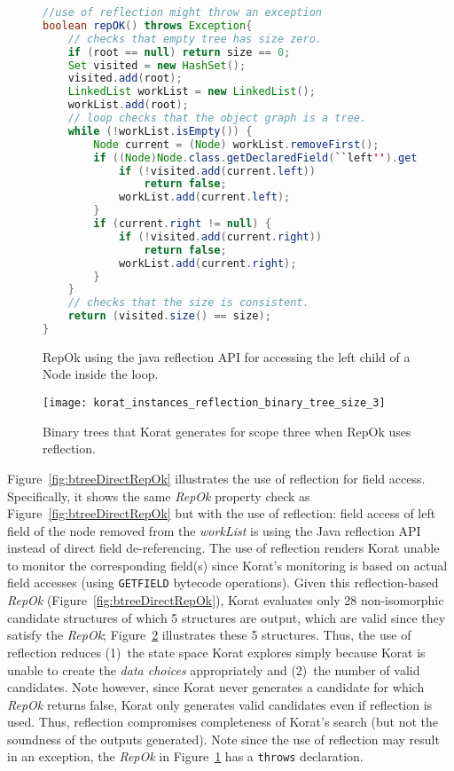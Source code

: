 \begin{figure}
\centering
\begin{lstlisting}[language=Java]
//use of reflection might throw an exception
boolean repOK() throws Exception{
    // checks that empty tree has size zero.
    if (root == null) return size == 0;
    Set visited = new HashSet();
    visited.add(root);
    LinkedList workList = new LinkedList();
    workList.add(root);
    // loop checks that the object graph is a tree.
    while (!workList.isEmpty()) {
        Node current = (Node) workList.removeFirst();
        if ((Node)Node.class.getDeclaredField(``left'').get(current) != null) {
            if (!visited.add(current.left)) 
                return false;
            workList.add(current.left);
        }
        if (current.right != null) {
            if (!visited.add(current.right))
                return false;
            workList.add(current.right);
        }
    }
    // checks that the size is consistent.
    return (visited.size() == size);
}
\end{lstlisting}
\caption{RepOk using the java reflection API for accessing the left child of a Node inside the loop.}
\label{fig:btTreeReflectionRepOK}
\end{figure}


\begin{figure}
\centering
\texttt{[image: korat\_instances\_reflection\_binary\_tree\_size\_3]}
\caption{ Binary trees that Korat generates for scope three when RepOk uses reflection.}
\label{fig:btreeReflectKoratGenScopeThree}
\end{figure}

Figure~\ref{fig:btreeDirectRepOk} illustrates the use of reflection
for field access.  Specifically, it shows the same \emph{RepOk} property
check as Figure~\ref{fig:btreeDirectRepOk} but with the use of
reflection: field access of left field of the node removed from the
\emph{workList} is using the Java reflection API instead of direct
field de-referencing.  The use of reflection renders Korat unable to
monitor the corresponding field(s) since Korat's monitoring is based
on actual field accesses (using \texttt{GETFIELD} bytecode
operations).  Given this reflection-based \emph{RepOk}
(Figure~\ref{fig:btreeDirectRepOk}), Korat evaluates only 28
non-isomorphic candidate structures of which 5 structures are output,
which are valid since they satisfy the \emph{RepOk};
Figure~\ref{fig:btreeReflectKoratGenScopeThree} illustrates these 5
structures.  Thus, the use of reflection reduces (1)~the state space
Korat explores simply because Korat is unable to create the \emph{data
  choices} appropriately and (2)~the number of valid candidates.  Note
however, since Korat never generates a candidate for which \emph{RepOk}
returns false, Korat only generates valid candidates even if
reflection is used.  Thus, reflection compromises completeness of
Korat's search (but not the soundness of the outputs generated).  Note
since the use of reflection may result in an exception, the \emph{RepOk} in
Figure~\ref{fig:btTreeReflectionRepOK} has a \texttt{throws} declaration.

